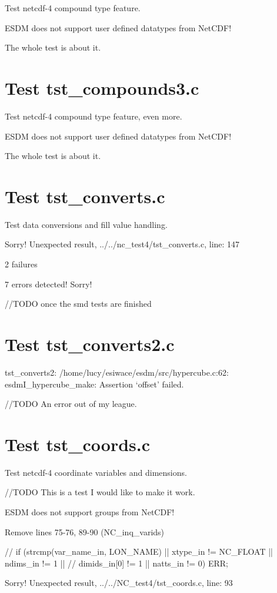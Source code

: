 Test netcdf-4 compound type feature.

ESDM does not support user defined datatypes from NetCDF!

The whole test is about it.

\section{Test tst\_compounds3.c}

Test netcdf-4 compound type feature, even more.

ESDM does not support user defined datatypes from NetCDF!

The whole test is about it.

\section{Test tst\_converts.c}

Test data conversions and fill value handling.

Sorry! Unexpected result, ../../nc\_test4/tst\_converts.c, line: 147

2 failures

7 errors detected! Sorry!

//TODO once the smd tests are finished

\section{Test tst\_converts2.c}

tst\_converts2: /home/lucy/esiwace/esdm/src/hypercube.c:62: esdmI\_hypercube\_make: Assertion `offset' failed.

//TODO An error out of my league.

\section{Test tst\_coords.c}

Test netcdf-4 coordinate variables and dimensions.

//TODO This is a test I would like to make it work.

ESDM does not support groups from NetCDF!

Remove lines 75-76, 89-90 (NC\_inq\_varids)

// if (strcmp(var\_name\_in, LON\_NAME) || xtype\_in != NC\_FLOAT || ndims\_in != 1 ||
// dimids\_in[0] != 1 || natts\_in != 0) ERR;

Sorry! Unexpected result, ../../NC\_test4/tst\_coords.c, line: 93

